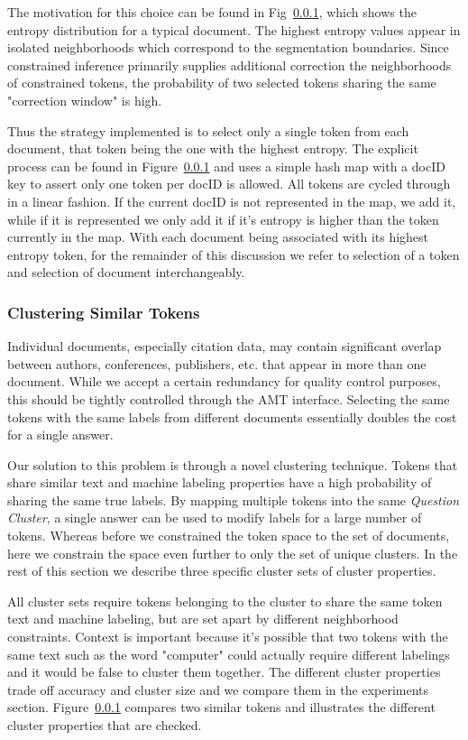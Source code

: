 The motivation for this choice can be found in Fig~\ref{}, which shows the entropy distribution for a typical document.  The highest entropy values appear in isolated neighborhoods which correspond to the segmentation boundaries.  Since constrained inference primarily supplies additional correction the neighborhoods of constrained tokens, the probability of two selected tokens sharing the same "correction window" is high.  

Thus the strategy implemented is to select only a single token from each document, that token being the one with the highest entropy.  The explicit process can be found in Figure~\ref{} and uses a simple hash map with a docID key to assert only one token per docID is allowed.  All tokens are cycled through in a linear fashion.  If the current docID is not represented in the map, we add it, while if it is represented we only add it if it's entropy is higher than the token currently in the map.  With each document being associated with its highest entropy token, for the remainder of this discussion we refer to selection of a token and selection of document interchangeably.


\subsubsection{Clustering Similar Tokens}
Individual documents, especially citation data, may contain significant overlap between authors, conferences, publishers, etc. that appear in more than one document.  While we accept a certain redundancy for quality control purposes, this should be tightly controlled through the AMT interface.  Selecting the same tokens with the same labels from different documents essentially doubles the cost for a single answer.

Our solution to this problem is through a novel clustering technique.  Tokens that share similar text and machine labeling properties have a high probability of sharing the same true labels.  By mapping multiple tokens into the same \textit{Question Cluster}, a single answer can be used to modify labels for a large number of tokens.  Whereas before we constrained the token space to the set of documents, here we constrain the space even further to only the set of unique clusters.  In the rest of this section we describe three specific cluster sets of cluster properties.

All cluster sets require tokens belonging to the cluster to share the same token text and machine labeling, but are set apart by different neighborhood constraints.  Context is important because it's possible that two tokens with the same text such as the word "computer" could actually require different labelings and it would be false to cluster them together.  The different cluster properties trade off accuracy and cluster size and we compare them in the experiments section.  Figure~\ref{} compares two similar tokens and illustrates the different cluster properties that are checked.

